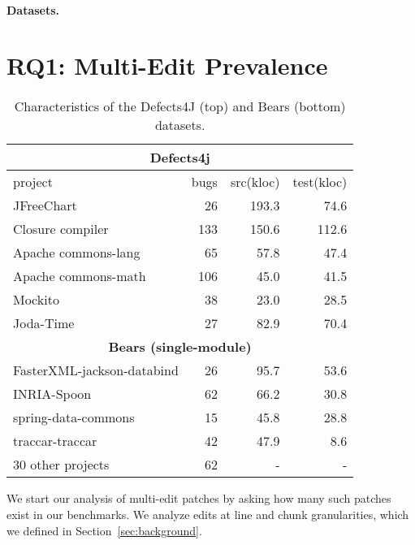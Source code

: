 \documentclass[sigconf, timestamp-false, anonymous=true]{acmart}
\begin{document}
\paragraph{Datasets.}  

\section{RQ1: Multi-Edit Prevalence}
\label{sec:data-rq1}

\begin{table}
\begin{tabular}{l | rrr}
\toprule
\multicolumn{4}{c}{\textbf{Defects4j}} \\
\midrule
project & bugs & src(kloc) & test(kloc) \\
\midrule
JFreeChart  & 26 & 193.3 & 74.6 \\
Closure compiler & 133 & 150.6 & 112.6 \\
Apache commons-lang & 65 & 57.8 & 47.4 \\
Apache commons-math & 106 & 45.0 & 41.5 \\
Mockito & 38 & 23.0 & 28.5 \\
Joda-Time & 27 & 82.9 & 70.4 \\
\midrule
\multicolumn{4}{c}{\textbf{Bears (single-module)}} \\
\midrule
FasterXML-jackson-databind & 26 & 95.7 & 53.6 \\
INRIA-Spoon & 62 & 66.2 & 30.8 \\
spring-data-commons & 15 & 45.8 & 28.8 \\
traccar-traccar & 42 & 47.9 & 8.6 \\
30 other projects & 62 & - & -\\
\bottomrule
\end{tabular}
\caption{\label{tab:data} Characteristics of the Defects4J (top) and Bears (bottom) datasets.}
\end{table}


We start our analysis of multi-edit patches by asking how many such patches 
exist in our benchmarks. We analyze edits at line and chunk granularities,
which we defined in Section~\ref{sec:background}.
\end{document}
